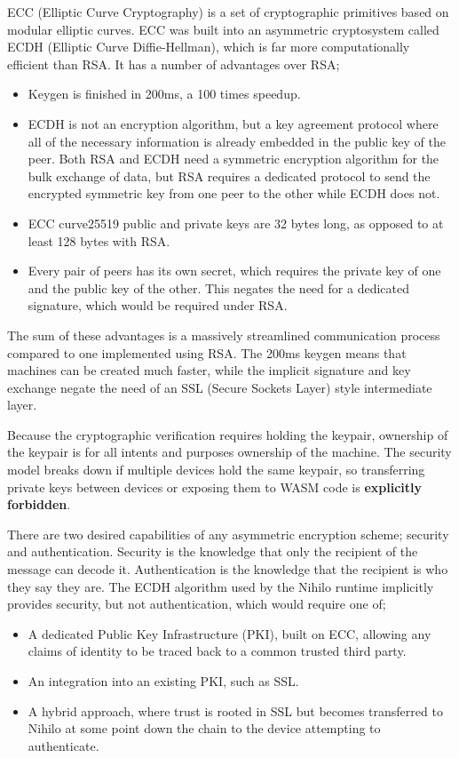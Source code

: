 \documentclass{article}
\begin{document}
ECC \cite{ecc}(Elliptic Curve Cryptography) is a set of cryptographic primitives based on modular elliptic curves. ECC was built into an asymmetric cryptosystem called ECDH (Elliptic Curve Diffie-Hellman), which is far more computationally efficient than RSA. It has a number of advantages over RSA;
\begin{itemize}
\item Keygen is finished in 200ms, a 100 times speedup.
\item ECDH is not an encryption algorithm, but a key agreement protocol where all of the necessary information is already embedded in the public key of the peer. Both RSA and ECDH need a symmetric encryption algorithm for the bulk exchange of data, but RSA requires a dedicated protocol to send the encrypted symmetric key from one peer to the other while ECDH does not.
\item ECC curve25519 public and private keys are 32 bytes long, as opposed to at least 128 bytes with RSA.
\item Every pair of peers has its own secret, which requires the private key of one and the public key of the other. This negates the need for a dedicated signature, which would be required under RSA.
\end{itemize}

The sum of these advantages is a massively streamlined communication process compared to one implemented using RSA. The 200ms keygen means that machines can be created much faster, while the implicit signature and key exchange negate the need of an SSL (Secure Sockets Layer) style intermediate layer.

Because the cryptographic verification requires holding the keypair, ownership of the keypair is for all intents and purposes ownership of the machine. The security model breaks down if multiple devices hold the same keypair, so transferring private keys between devices or exposing them to WASM code is \textbf{explicitly forbidden}.

There are two desired capabilities of any asymmetric encryption scheme; security and authentication. Security is the knowledge that only the recipient of the message can decode it. Authentication is the knowledge that the recipient is who they say they are. The ECDH algorithm used by the Nihilo runtime implicitly provides security, but not authentication, which would require one of;

\begin{itemize}
\item A dedicated Public Key Infrastructure (PKI), built on ECC, allowing any claims of identity to be traced back to a common trusted third party.
\item An integration into an existing PKI, such as SSL.
\item A hybrid approach, where trust is rooted in SSL but becomes transferred to Nihilo at some point down the chain to the device attempting to authenticate.
\end{itemize}
\end{document}
